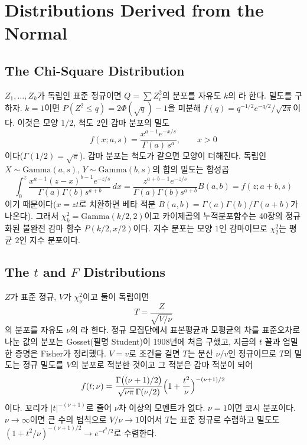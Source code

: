\section{Distributions Derived from the Normal}
\label{sec:normal-derived}

\subsection{The Chi-Square Distribution}

$Z_1,\dots,Z_k$가 독립인 표준 정규이면 $Q=\sum Z_i^2$의 분포를 자유도 $k$의 라 한다. 밀도를 구하자. $k=1$이면 $P(Z^2\le q)=2\Phi(\sqrt q)-1$을 미분해 $f(q)=q^{-1/2}e^{-q/2}/\sqrt{2\pi}$이다. 이것은 모양 $1/2$, 척도 $2$인 감마 분포의 밀도
\[
f(x;a,s)=\frac{x^{a-1}e^{-x/s}}{\Gamma(a)\,s^a},\qquad x>0
\]
이다($\Gamma(1/2)=\sqrt\pi$). 감마 분포는 척도가 같으면 모양이 더해진다. 독립인 $X\sim\mathrm{Gamma}(a,s)$, $Y\sim\mathrm{Gamma}(b,s)$의 합의 밀도는 합성곱
\[
\int_0^z\frac{x^{a-1}(z-x)^{b-1}e^{-z/s}}{\Gamma(a)\Gamma(b)s^{a+b}}\,dx=\frac{z^{a+b-1}e^{-z/s}}{\Gamma(a)\Gamma(b)s^{a+b}}B(a,b)=f(z;a+b,s)
\]
이기 때문이다($x=zt$로 치환하면 베타 적분 $B(a,b)=\Gamma(a)\Gamma(b)/\Gamma(a+b)$가 나온다). 그래서 $\chi^2_k=\mathrm{Gamma}(k/2,2)$이고 카이제곱의 누적분포함수는 40장의 정규화된 불완전 감마 함수 $P(k/2,x/2)$이다. 지수 분포는 모양 $1$인 감마이므로 $\chi^2_2$는 평균 $2$인 지수 분포이다.

\subsection{The $t$ and $F$ Distributions}

$Z$가 표준 정규, $V$가 $\chi^2_\nu$이고 둘이 독립이면
\[
T=\frac Z{\sqrt{V/\nu}}
\]
의 분포를 자유도 $\nu$의 라 한다. 정규 모집단에서 표본평균과 모평균의 차를 표준오차로 나눈 값의 분포는 Gosset(필명 Student)이 1908년에 처음 구했고\cite{student1908}, 지금의 $t$ 꼴과 엄밀한 증명은 Fisher가 정리했다. $V=v$로 조건을 걸면 $T$는 분산 $\nu/v$인 정규이므로 $T$의 밀도는 정규 밀도를 $V$의 분포로 적분한 것이고 그 적분은 감마 적분이 되어
\[
f(t;\nu)=\frac{\Gamma\bigl((\nu+1)/2\bigr)}{\sqrt{\nu\pi}\,\Gamma(\nu/2)}\Bigl(1+\frac{t^2}\nu\Bigr)^{-(\nu+1)/2}
\]
이다. 꼬리가 $|t|^{-(\nu+1)}$로 줄어 $\nu$차 이상의 모멘트가 없다. $\nu=1$이면 코시 분포이다. $\nu\to\infty$이면 큰 수의 법칙으로 $V/\nu\to1$이어서 $T$는 표준 정규로 수렴하고 밀도도 $(1+t^2/\nu)^{-(\nu+1)/2}\to e^{-t^2/2}$로 수렴한다.

